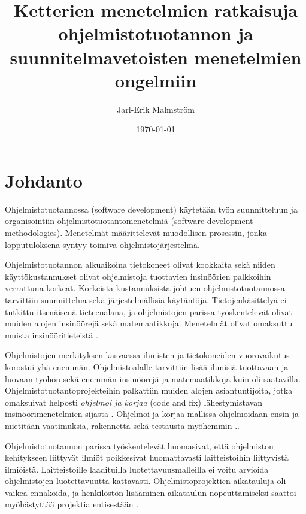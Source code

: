 \documentclass[finnish]{tktltiki2}
\title{Ketterien menetelmien ratkaisuja ohjelmistotuotannon ja suunnitelmavetoisten menetelmien ongelmiin}
\author{Jarl-Erik Malmström}
\date{\today}
\theoremstyle{definition}
\theoremstyle{remark}
\begin{document}

\maketitle        %
\makeabstract     %

\tableofcontents  %
\newpage          %



\section{Johdanto}
 
Ohjelmistotuotannossa (software development) käytetään työn suunnitteluun ja organisointiin ohjelmistotuotantomenetelmiä (software development methodologies). Menetelmät määrittelevät muodollisen prosessin, jonka lopputuloksena syntyy toimiva ohjelmistojärjestelmä.

Ohjelmistotuotannon alkuaikoina tietokoneet olivat kookkaita sekä niiden käyttö\-kustannukset olivat ohjelmistoja tuottavien insinöörien palkkoihin verrattuna korkeat. Korkeista kustannuksista johtuen ohjelmistotuotannossa tarvittiin suunnittelua sekä järjestelmällisiä käytäntöjä. Tietojenkäsittelyä ei tutkittu itsenäisenä tieteenalana, ja ohjelmistojen parissa työsken\-televät olivat muiden alojen insinöörejä sekä matemaatikkoja. Menetelmät olivat omaksuttu muista insinööritieteistä \cite{BOE06}.

Ohjelmistojen merkityksen kasvaessa ihmisten ja tietokoneiden vuorovaikutus korostui yhä enemmän. Ohjelmistoalalle tarvittiin lisää ihmisiä tuottavaan ja luovaan työhön sekä enemmän insinöörejä ja matemaatikkoja kuin oli saatavilla. Ohjelmistotuotantoprojekteihin palkattiin muiden alojen asiantuntijoita, jotka omaksuivat helposti \textit{ohjelmoi ja korjaa} (code and fix) lähestymistavan insinööri\-menetelmien sijasta \cite{BOE06}. Ohjelmoi ja korjaa mallissa ohjelmoidaan ensin ja mietitään vaatimuksia, rakennetta sekä testausta myöhemmin .\cite{BOE88}.

Ohjelmistotuotannon parissa työskentelevät huomasivat, että ohjelmiston kehitykseen liittyvät ilmiöt poikkesivat huomattavasti laitteistoihin liittyvistä ilmiöistä. Laitteistoille laadituilla luotettavuusmalleilla ei voitu arvioida ohjelmistojen luotettavuutta kattavasti. Ohjelmistoprojektien aikatauluja oli vaikea ennakoida, ja henkilöstön lisääminen aikataulun nopeuttamiseksi saattoi myöhästyttää projektia entisestään \cite{BOE06}.
\end{document}

